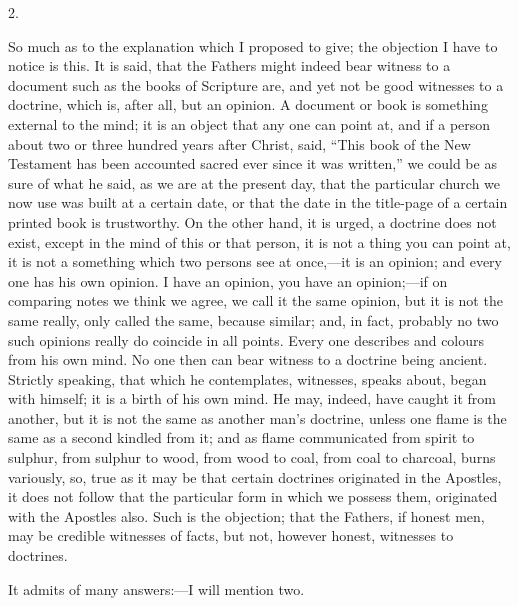 2.

So much as to the explanation which I proposed to give; the
objection I have to notice is this. It is said, that the Fathers might
indeed bear witness to a document such as the books of Scripture are,
and yet not be good witnesses to a doctrine, which is, after all, but
an opinion. A document or book is something external to the mind; it
is an object that any one can point at, and if a person about two or
three hundred years after Christ, said, ``This book of the New
Testament has been accounted sacred ever since it was written,''
we could be as sure of what he said, as we are at the present day,
that the particular church we now use was built at a certain date, or
that the date in the title-page of a certain printed book is
trustworthy. On the other hand, it is urged, a doctrine does not
exist, except in the mind of this or that person, it is not a thing
you can point at, it is not a something which two persons see at once,—it
is an opinion; and every one has his own opinion. I have an opinion,
you have an opinion;—if on comparing notes we think we agree, we
call it the same opinion, but it is not the same really, only called
the same, because similar; and, in fact, probably no two such opinions
really do coincide in all points. Every one describes and colours from
his own mind. No one then can bear witness to a doctrine being
ancient. Strictly speaking, that which he contemplates, witnesses,
speaks about, began with himself; it is a birth of his own mind. He
may, indeed, have caught it from another, but it is not the same as
another man's doctrine, unless one flame is the same as a second
kindled from it; and as flame communicated from spirit to sulphur,
from sulphur to wood, from wood to coal, from coal to charcoal, burns
variously, so, true as it may be that certain doctrines originated in the Apostles, it does not follow that the particular
form in which we possess them, originated with the Apostles also. Such
is the objection; that the Fathers, if honest men, may be credible
witnesses of facts, but not, however honest, witnesses to doctrines.

It admits of many answers:—I will mention two.

